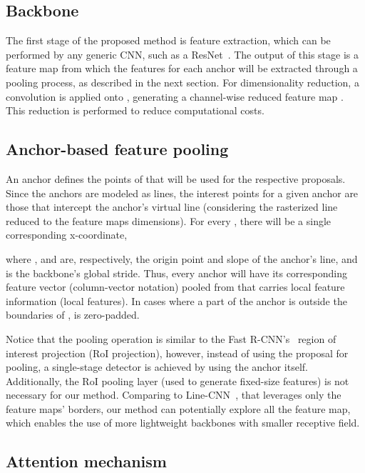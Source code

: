 \documentclass[final]{cvpr}
\begin{document}
\subsection{Backbone}

The first stage of the proposed method is feature extraction, which can be performed by any generic CNN, such as a ResNet~\cite{he2016deep}. The output of this stage is a feature map  from which the features for each anchor will be extracted through a pooling process, as described in the next section. For dimensionality reduction, a  convolution is applied onto , generating a channel-wise reduced feature map . This reduction is performed to reduce computational costs.


\subsection{Anchor-based feature pooling}

An anchor defines the points of  that will be used for the respective proposals. Since the anchors are modeled as lines, the interest points for a given anchor are those that intercept the anchor's virtual line (considering the rasterized line reduced to the feature maps dimensions). For every , there will be a single corresponding x-coordinate,

where ,  and  are, respectively, the origin point and slope of the anchor's line, and  is the backbone's global stride. Thus, every anchor  will have its corresponding feature vector  (column-vector notation) pooled from  that carries local feature information (local features). In cases where a part of the anchor is outside the boundaries of ,  is zero-padded.

Notice that the pooling operation is similar to the Fast R-CNN's~\cite{fastrcnn} region of interest projection (RoI projection), however, instead of using the proposal for pooling, a single-stage detector is achieved by using the anchor itself. Additionally, the RoI pooling layer (used to generate fixed-size features) is not necessary for our method. Comparing to Line-CNN~\cite{linecnn}, that leverages only the feature maps' borders, our method can potentially explore all the feature map, which enables the use of more lightweight backbones with smaller receptive field.




\subsection{Attention mechanism}
\end{document}
